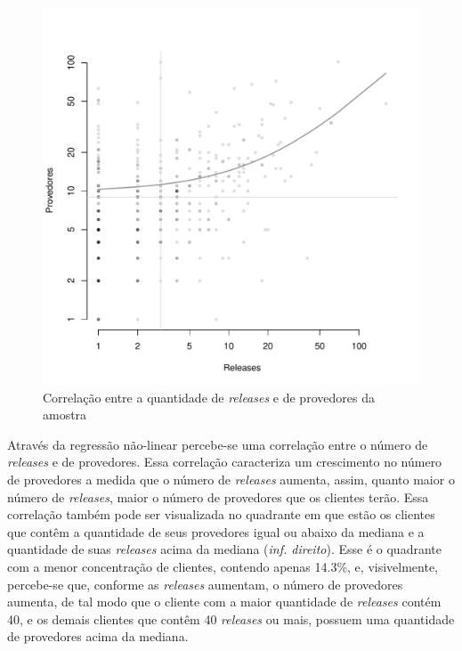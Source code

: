\begin{figure}
    \centering
    \includegraphics[scale=0.5]{figuras/correlation_release_providers.pdf}
    \caption{Correlação entre a quantidade de \textit{releases} e de provedores da amostra}
    \label{fig:correlation_release_providers}
\end{figure}{}

Através da regressão não-linear percebe-se uma correlação entre o número de \textit{releases} e de provedores. Essa correlação caracteriza um crescimento no número de provedores a medida que o número de \textit{releases} aumenta, assim, quanto maior o número de \textit{releases}, maior o número de provedores que os clientes terão. Essa correlação também pode ser visualizada no quadrante em que estão os clientes que contêm a quantidade de seus provedores igual ou abaixo da mediana e a quantidade de suas \textit{releases} acima da mediana (\textit{inf. direito}). Esse é o quadrante com a menor concentração de clientes, contendo apenas 14.3\%, e, visivelmente, percebe-se que, conforme as \textit{releases} aumentam, o número de provedores aumenta, de tal modo que o cliente com a maior quantidade de \textit{releases} contém 40, e os demais clientes que contêm 40 \textit{releases} ou mais, possuem uma quantidade de provedores acima da mediana.

